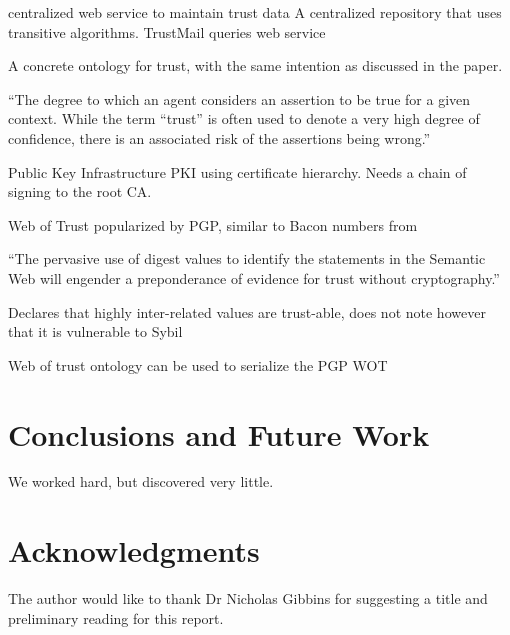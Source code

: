 \documentclass{acm_proc_article-sp}
\begin{document}
centralized web service to maintain trust data
A centralized repository that uses transitive algorithms.
TrustMail queries web service 
\cite{golbeck_trust_2003}

A concrete ontology for trust, with the same intention as discussed in the paper.
\cite{jennifer_golbeck_trust_2013}


``The degree to which an agent considers an assertion to be true for a given context. While the term ``trust'' is often used to denote a very high degree of confidence, there is an associated risk of the assertions being wrong.''

Public Key Infrastructure PKI using certificate hierarchy.
Needs a chain of signing to the root CA.

Web of Trust popularized by PGP, similar to Bacon numbers from \cite{golbeck_trust_2003}

``The pervasive use of digest values to identify the statements in the Semantic Web will engender a preponderance of evidence for trust without cryptography.''

Declares that highly inter-related values are trust-able, does not note however that it is vulnerable to Sybil\cite{douceur_sybil_2002}
\cite{reagle_key_2002}

Web of trust ontology can be used to serialize the PGP WOT
\cite{_web_2004}

\section{Conclusions and Future Work}
We worked hard, but discovered very little.

\section{Acknowledgments}
The author would like to thank Dr Nicholas Gibbins for suggesting a title and preliminary reading for this report.

%


%
%
\end{document}
